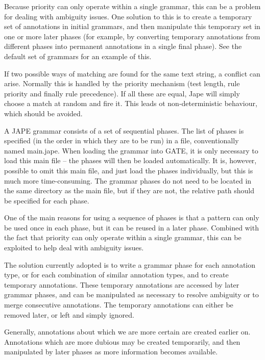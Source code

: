 Because priority can only operate within a single grammar, this can be
a problem for dealing with ambiguity issues. One solution to this is
to create a temporary set of annotations in initial grammars, and then
manipulate this temporary set in one or more later phases (for
example, by converting temporary annotations from different phases
into permanent annotations in a single final phase). See the default
set of grammars for an example of this.

If two possible ways of matching are found for the
same text string, a conflict can arise. Normally this is handled by
the priority mechanism (test length, rule priority and finally rule
precedence). If all these are equal, Jape will simply choose a match
at random and fire it. This leads ot non-deterministic behaviour,
which should be avoided.


A JAPE grammar consists of a set of sequential phases. The list of
phases is specified (in the order in which they are to be run) in a
file, conventionally named main.jape. When loading the grammar into
GATE, it is only necessary to load this main file -- the phases will
then be loaded automatically. It is, however, possible to omit this
main file, and just load the phases individually, but this is much
more time-consuming. The grammar phases do not need to be located in
the same directory as the main file, but if they are not, the relative
path should be specified for each phase.

One of the main reasons for using a sequence of phases is that a
pattern can only be used once in each phase, but it can be reused in a
later phase. Combined with the fact that priority can only operate
within a single grammar, this can be exploited to help deal with
ambiguity issues.

The solution currently adopted is to write a grammar phase for each
annotation type, or for each combination of similar annotation types,
and to create temporary annotations. These temporary annotations are
accessed by later grammar phases, and can be manipulated as necessary
to resolve ambiguity or to merge consecutive annotations. The temporary
annotations can either be removed later, or left and simply ignored.

Generally, annotations about which we are more certain are created
earlier on. Annotations which are more dubious may be created
temporarily, and then manipulated by later phases as more information
becomes available.

